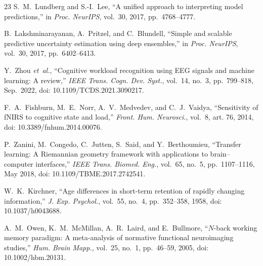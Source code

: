 \documentclass[conference]{IEEEtran}
\begin{document}
\begin{thebibliography}{23}
S.~M.~Lundberg and S.-I.~Lee, ``A unified approach to interpreting model predictions,'' in \textit{Proc. NeurIPS}, vol.~30, 2017, pp.~4768--4777.

B.~Lakshminarayanan, A.~Pritzel, and C.~Blundell, ``Simple and scalable predictive uncertainty estimation using deep ensembles,'' in \textit{Proc. NeurIPS}, vol.~30, 2017, pp.~6402--6413.

Y.~Zhou \textit{et~al.}, ``Cognitive workload recognition using EEG signals and machine learning: A review,'' \textit{IEEE Trans. Cogn. Dev. Syst.}, vol.~14, no.~3, pp.~799--818, Sep.\ 2022, doi: 10.1109/TCDS.2021.3090217.

F.~A.~Fishburn, M.~E.~Norr, A.~V.~Medvedev, and C.~J.~Vaidya, ``Sensitivity of fNIRS to cognitive state and load,'' \textit{Front. Hum. Neurosci.}, vol.~8, art. 76, 2014, doi: 10.3389/fnhum.2014.00076.

P.~Zanini, M.~Congedo, C.~Jutten, S.~Said, and Y.~Berthoumieu, ``Transfer learning: A Riemannian geometry framework with applications to brain--computer interfaces,'' \textit{IEEE Trans. Biomed. Eng.}, vol.~65, no.~5, pp.~1107--1116, May 2018, doi: 10.1109/TBME.2017.2742541.

W.~K.~Kirchner, ``Age differences in short-term retention of rapidly changing information,'' \textit{J. Exp. Psychol.}, vol.~55, no.~4, pp.~352--358, 1958, doi: 10.1037/h0043688.

A.~M.~Owen, K.~M.~McMillan, A.~R.~Laird, and E.~Bullmore, ``$N$-back working memory paradigm: A meta-analysis of normative functional neuroimaging studies,'' \textit{Hum. Brain Mapp.}, vol.~25, no.~1, pp.~46--59, 2005, doi: 10.1002/hbm.20131.

\end{thebibliography}
\end{document}

